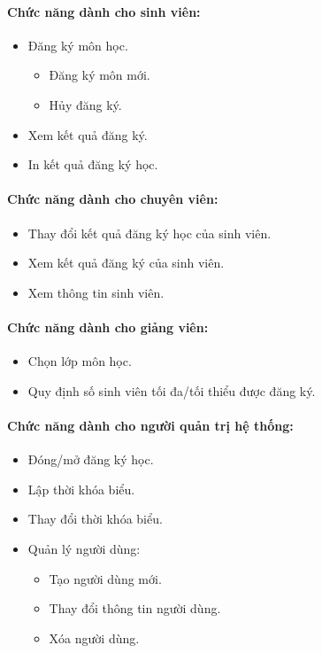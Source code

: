 \documentclass{article}
\begin{document}
    \paragraph{
      \textnormal{
        Chức năng dành cho sinh viên:
      }
    }
    \begin{itemize}
      \item Đăng ký môn học.
        \begin{itemize}
          \item Đăng ký môn mới.
          \item Hủy đăng ký.
        \end{itemize}
      \item Xem kết quả đăng ký.
      \item In kết quả đăng ký học.
    \end{itemize}

    \paragraph{
      \textnormal{
        Chức năng dành cho chuyên viên:
      }
    }
    \begin{itemize}
      \item Thay đổi kết quả đăng ký học của sinh viên.
      \item Xem kết quả đăng ký của sinh viên.
      \item Xem thông tin sinh viên.
    \end{itemize}

    \paragraph{
      \textnormal{
        Chức năng dành cho giảng viên:
      }
    }
    \begin{itemize}
      \item Chọn lớp môn học.
      \item Quy định số sinh viên tối đa/tối thiểu được đăng ký.
    \end{itemize}

    \paragraph{
      \textnormal{
        Chức năng dành cho người quản trị hệ thống:
      }
    }
    \begin{itemize}
      \item Đóng/mở đăng ký học.
      \item Lập thời khóa biểu.
      \item Thay đổi thời khóa biểu.
      \item Quản lý người dùng:
      \begin{itemize}
        \item Tạo người dùng mới.
        \item Thay đổi thông tin người dùng.
        \item Xóa người dùng.
      \end{itemize}
    \end{itemize}
\end{document}
